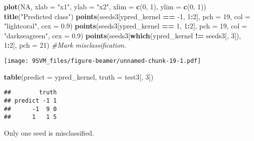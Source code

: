 \documentclass[10pt,ignorenonframetext,]{beamer}
\newenvironment{Shaded}{\begin{snugshade}}{\end{snugshade}}
\newcommand{\KeywordTok}[1]{\textcolor[rgb]{0.13,0.29,0.53}{\textbf{#1}}}
\newcommand{\DataTypeTok}[1]{\textcolor[rgb]{0.13,0.29,0.53}{#1}}
\newcommand{\DecValTok}[1]{\textcolor[rgb]{0.00,0.00,0.81}{#1}}
\newcommand{\FloatTok}[1]{\textcolor[rgb]{0.00,0.00,0.81}{#1}}
\newcommand{\StringTok}[1]{\textcolor[rgb]{0.31,0.60,0.02}{#1}}
\newcommand{\CommentTok}[1]{\textcolor[rgb]{0.56,0.35,0.01}{\textit{#1}}}
\newcommand{\OtherTok}[1]{\textcolor[rgb]{0.56,0.35,0.01}{#1}}
\newcommand{\OperatorTok}[1]{\textcolor[rgb]{0.81,0.36,0.00}{\textbf{#1}}}
\newcommand{\NormalTok}[1]{#1}
\begin{document}
\begin{frame}[fragile]

\begin{Shaded}
\begin{Highlighting}[]
\KeywordTok{plot}\NormalTok{(}\OtherTok{NA}\NormalTok{, }\DataTypeTok{xlab =} \StringTok{"x1"}\NormalTok{, }\DataTypeTok{ylab =} \StringTok{"x2"}\NormalTok{, }\DataTypeTok{xlim =} \KeywordTok{c}\NormalTok{(}\DecValTok{0}\NormalTok{, }\DecValTok{1}\NormalTok{), }\DataTypeTok{ylim =} \KeywordTok{c}\NormalTok{(}\DecValTok{0}\NormalTok{, }\DecValTok{1}\NormalTok{))}
\KeywordTok{title}\NormalTok{(}\StringTok{"Predicted class"}\NormalTok{)}
\KeywordTok{points}\NormalTok{(seeds3[ypred_kernel }\OperatorTok{==}\StringTok{ }\DecValTok{-1}\NormalTok{, }\DecValTok{1}\OperatorTok{:}\DecValTok{2}\NormalTok{], }\DataTypeTok{pch =} \DecValTok{19}\NormalTok{, }\DataTypeTok{col =} \StringTok{"lightcoral"}\NormalTok{, }
    \DataTypeTok{cex =} \FloatTok{0.9}\NormalTok{)}
\KeywordTok{points}\NormalTok{(seeds3[ypred_kernel }\OperatorTok{==}\StringTok{ }\DecValTok{1}\NormalTok{, }\DecValTok{1}\OperatorTok{:}\DecValTok{2}\NormalTok{], }\DataTypeTok{pch =} \DecValTok{19}\NormalTok{, }\DataTypeTok{col =} \StringTok{"darkseagreen"}\NormalTok{, }
    \DataTypeTok{cex =} \FloatTok{0.9}\NormalTok{)}
\KeywordTok{points}\NormalTok{(seeds3[}\KeywordTok{which}\NormalTok{(ypred_kernel }\OperatorTok{!=}\StringTok{ }\NormalTok{seeds3[, }\DecValTok{3}\NormalTok{]), }\DecValTok{1}\OperatorTok{:}\DecValTok{2}\NormalTok{], }\DataTypeTok{pch =} \DecValTok{21}\NormalTok{)  }\CommentTok{#Mark misclassification.}
\end{Highlighting}
\end{Shaded}

\texttt{[image: 9SVM\_files/figure-beamer/unnamed-chunk-19-1.pdf]}

\begin{Shaded}
\begin{Highlighting}[]
\KeywordTok{table}\NormalTok{(}\DataTypeTok{predict =}\NormalTok{ ypred_kernel, }\DataTypeTok{truth =}\NormalTok{ test3[, }\DecValTok{3}\NormalTok{])}
\end{Highlighting}
\end{Shaded}

\begin{verbatim}
##        truth
## predict -1 1
##      -1  9 0
##      1   1 5
\end{verbatim}

Only one seed is misclassified.

\end{frame}
\end{document}
